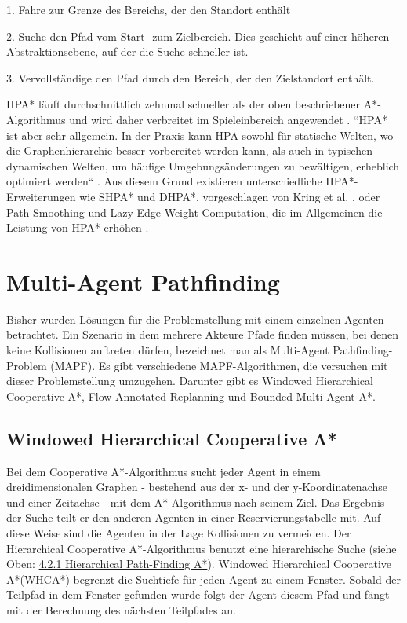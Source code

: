 1. Fahre zur Grenze des Bereichs, der den Standort enthält

2. Suche den Pfad vom Start- zum Zielbereich. Dies geschieht auf einer höheren Abstraktionsebene, auf der die Suche schneller ist.

3. Vervollständige den Pfad durch den Bereich, der den Zielstandort enthält.\\

\begin{sloppypar}
HPA* läuft durchschnittlich zehnmal schneller als der oben beschriebener A*-Algorithmus \cite[S. 1, 26]{Bot04} und wird daher verbreitet im Spieleinbereich angewendet \cite{LSC08}. ``HPA* ist aber sehr allgemein. In der Praxis kann HPA sowohl für statische Welten, wo die Graphenhierarchie besser vorbereitet werden kann, als auch in typischen dynamischen Welten, um häufige Umgebungsänderungen zu bewältigen, erheblich optimiert werden`` \cite[S. 39]{Kri10}. Aus diesem Grund existieren unterschiedliche HPA*-Erweiterungen wie SHPA* und DHPA*, vorgeschlagen von Kring et al. \cite[40-43]{Kri10}, oder Path Smoothing und Lazy Edge Weight Computation, die im Allgemeinen die Leistung von HPA* erhöhen \cite{JB07}.
\end{sloppypar}



\section{Multi-Agent Pathfinding}
Bisher wurden Lösungen für die Problemstellung mit einem einzelnen Agenten betrachtet. Ein Szenario in dem mehrere Akteure Pfade finden müssen, bei denen keine Kollisionen auftreten dürfen, bezeichnet man als Multi-Agent Pathfinding-Problem (MAPF). Es gibt verschiedene MAPF-Algorithmen, die versuchen mit dieser Problemstellung umzugehen. Darunter gibt es Windowed Hierarchical Cooperative A*, Flow Annotated Replanning und Bounded Multi-Agent A*.

\subsection{Windowed Hierarchical Cooperative A*}
Bei dem Cooperative A*-Algorithmus sucht jeder Agent in einem dreidimensionalen Graphen - bestehend aus der x- und der y-Koordinatenachse und einer Zeitachse - mit dem A*-Algorithmus nach seinem Ziel. 
Das Ergebnis der Suche teilt er den anderen Agenten in einer Reservierungstabelle mit. Auf diese Weise sind die Agenten in der Lage Kollisionen zu vermeiden. 
Der Hierarchical Cooperative A*-Algorithmus benutzt eine hierarchische Suche (siehe Oben: \hyperref[sec:hpa]{4.2.1 Hierarchical Path-Finding A*}). Windowed Hierarchical Cooperative A*(WHCA*) begrenzt die Suchtiefe für jeden Agent zu einem Fenster. Sobald der Teilpfad in dem Fenster gefunden wurde folgt der Agent diesem Pfad und fängt mit der Berechnung des nächsten Teilpfades an.

